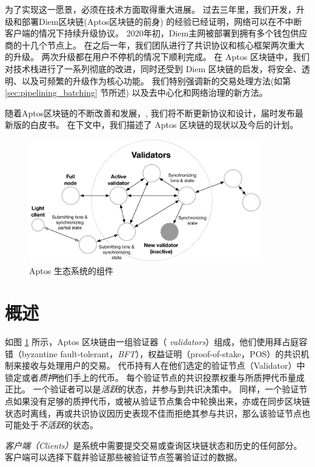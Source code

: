 \documentclass{article}
\begin{document}
为了实现这一愿景，必须在技术方面取得重大进展。 过去三年里，我们开发，升级和部署Diem区块链(Aptos区块链的前身) 的经验已经证明，网络可以在不中断客户端的情况下持续升级协议\cite{diem_blockchain}。 2020年初，Diem主网被部署到拥有多个钱包供应商的十几个节点上。 在之后一年，我们团队进行了共识协议和核心框架两次重大的升级。 两次升级都在用户不停机的情况下顺利完成。 在 Aptos 区块链中，我们对技术栈进行了一系列彻底的改进，同时还受到 Diem 区块链的启发，将安全、透明、以及可频繁的升级作为核心功能。 我们特别强调新的交易处理方法(如第 \ref{sec:pipelining_batching} 节所述) 以及去中心化和网络治理的新方法。

随着Aptos区块链的不断改善和发展，, 我们将不断更新协议和设计，届时发布最新版的白皮书。 在下文中，我们描述了 Aptos 区块链的现状以及今后的计划。

\begin{figure}
\centering
\includegraphics[width=0.9\textwidth]{validators.pdf}
\caption{\label{fig:aptos_ecosystem}Aptos 生态系统的组件}
\end{figure}

\section{概述}
如图 \ref{fig:aptos_ecosystem} 所示，Aptos 区块链由一组验证器（ \emph{validators}）组成，他们使用拜占庭容错（byzantine fault-tolerant，\emph{BFT}），权益证明（proof-of-stake，POS）的共识机制来接收与处理用户的交易。 代币持有人在他们选定的验证节点（Validator）中锁定或者\emph{质押}他们手上的代币。 每个验证节点的共识投票权重与所质押代币量成正比。 一个验证者可以是\emph{活跃}的状态，并参与到共识决策中。 同样，一个验证节点如果没有足够的质押代币，或被从验证节点集合中轮换出来，亦或在同步区块链状态时离线，再或共识协议因历史表现不佳而拒绝其参与共识，那么该验证节点也可能处于\emph{不活跃}的状态。

\emph{客户端（Clients）}是系统中需要提交交易或查询区块链状态和历史的任何部分。客户端可以选择下载并验证那些被验证节点签署验证过的数据。 
\end{document}
